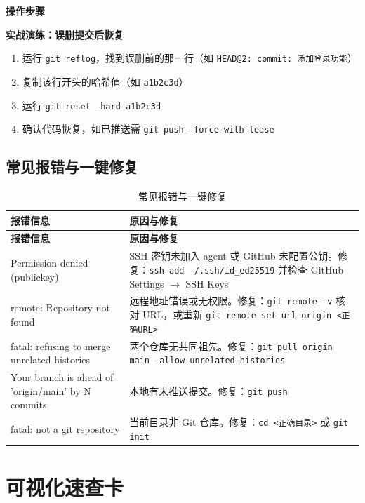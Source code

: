 \documentclass[12pt,a4paper,openany]{ctexbook}
\newenvironment{stepbox}{%
  \medskip
  \noindent\textbf{\faCogs\; 操作步骤}
  \smallskip
}{%
  \medskip
}
\begin{document}
\begin{stepbox}
\textbf{实战演练：误删提交后恢复}
\begin{enumerate}[leftmargin=1.5em]
  \item 运行 \texttt{git reflog}，找到误删前的那一行（如 \texttt{HEAD@{2}: commit: 添加登录功能}）
  \item 复制该行开头的哈希值（如 \texttt{a1b2c3d}）
  \item 运行 \texttt{git reset --hard a1b2c3d}
  \item 确认代码恢复，如已推送需 \texttt{git push --force-with-lease}
\end{enumerate}
\end{stepbox}

\section{常见报错与一键修复}

\begin{longtable}{p{4cm} p{10cm}}
\caption{常见报错与一键修复}\label{tab:common-errors}\\
\toprule
\textbf{报错信息} & \textbf{原因与修复} \\
\midrule
\endfirsthead
\toprule
\textbf{报错信息} & \textbf{原因与修复} \\
\midrule
\endhead
Permission denied (publickey) & SSH 密钥未加入 agent 或 GitHub 未配置公钥。修复：\texttt{ssh-add ~/.ssh/id\_ed25519} 并检查 GitHub Settings $\to$ SSH Keys \\
remote: Repository not found & 远程地址错误或无权限。修复：\texttt{git remote -v} 核对 URL，或重新 \texttt{git remote set-url origin <正确URL>} \\
fatal: refusing to merge unrelated histories & 两个仓库无共同祖先。修复：\texttt{git pull origin main --allow-unrelated-histories} \\
Your branch is ahead of 'origin/main' by N commits & 本地有未推送提交。修复：\texttt{git push} \\
fatal: not a git repository & 当前目录非 Git 仓库。修复：\texttt{cd <正确目录>} 或 \texttt{git init} \\
\bottomrule
\end{longtable}

\chapter*{可视化速查卡}
\end{document}
